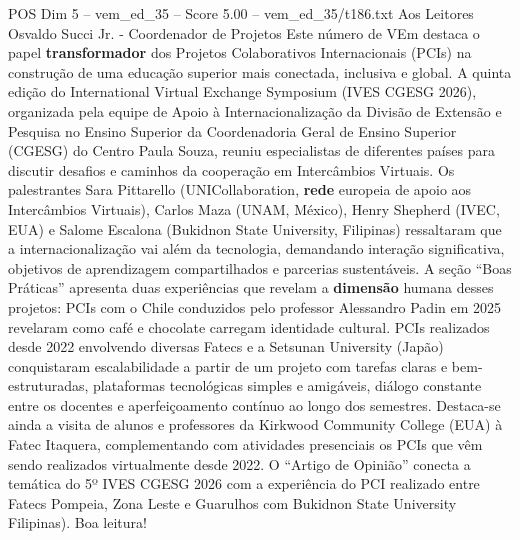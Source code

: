 \begin{textsample}{POS Dim 5 – vem\_ed\_35 – Score 5.00 – vem\_ed\_35/t186.txt}  \label{ex:f5_pos_010}
Aos Leitores Osvaldo Succi Jr. - Coordenador de Projetos Este número de VEm destaca o papel \textbf{transformador} dos Projetos Colaborativos Internacionais (PCIs) na construção de uma educação superior mais conectada, inclusiva e global.
A quinta edição do International Virtual Exchange Symposium (IVES CGESG 2026), organizada pela equipe de Apoio à Internacionalização da Divisão de Extensão e Pesquisa no Ensino Superior da Coordenadoria Geral de Ensino Superior (CGESG) do Centro Paula Souza, reuniu especialistas de diferentes países para discutir desafios e caminhos da cooperação em Intercâmbios Virtuais.
Os palestrantes Sara Pittarello (UNICollaboration, \textbf{rede} europeia de apoio aos Intercâmbios Virtuais), Carlos Maza (UNAM, México), Henry Shepherd (IVEC, EUA) e Salome Escalona (Bukidnon State University, Filipinas) ressaltaram que a internacionalização vai além da tecnologia, demandando interação significativa, objetivos de aprendizagem compartilhados e parcerias sustentáveis.
A seção “Boas Práticas” apresenta duas experiências que revelam a \textbf{dimensão} humana desses projetos: PCIs com o Chile conduzidos pelo professor Alessandro Padin em 2025 revelaram como café e chocolate carregam identidade cultural.
PCIs realizados desde 2022 envolvendo diversas Fatecs e a Setsunan University (Japão) conquistaram escalabilidade a partir de um projeto com tarefas claras e bem-estruturadas, plataformas tecnológicas simples e amigáveis, diálogo constante entre os docentes e aperfeiçoamento contínuo ao longo dos semestres.
Destaca-se ainda a visita de alunos e professores da Kirkwood Community College (EUA) à Fatec Itaquera, complementando com atividades presenciais os PCIs que vêm sendo realizados virtualmente desde 2022.
O “Artigo de Opinião” conecta a temática do 5º IVES CGESG 2026 com a experiência do PCI realizado entre Fatecs Pompeia, Zona Leste e Guarulhos com Bukidnon State University Filipinas).
Boa leitura!

\end{textsample}
